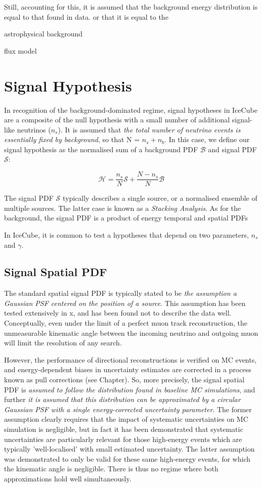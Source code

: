  Still, accounting for this, it is assumed that the background energy distribution is equal to that found in data. or that it is equal to the 
 
 astrophysical background
 
 flux model

\section{Signal Hypothesis}

In recognition of the background-dominated regime, signal hypotheses in IceCube are a composite of the null hypothesis with a small number of additional signal-like neutrinos ($n_{s}$). It is assumed that \emph{the total number of neutrino events is essentially fixed by background}, so that N = $n_{s} + n_{b}$. In this case, we define our signal hypothesis as the normalised sum of a background PDF $\mathcal{B}$ and signal PDF $\mathcal{S}$:

\[ \mathcal{H}= \frac{n_{s}}{N} \mathcal{S} + \frac{N - n_{s}}{N} \mathcal{B}  \]

The signal PDF $\mathcal{S}$ typically describes a single source, or a normalised ensemble of multiple sources. The latter case is known as a \emph{Stacking Analysis}. As for the background, the signal PDF is a product of energy temporal and spatial PDFs

In IceCube, it is common to test a hypotheses that depend on two parameters, $n_{s}$ and $\gamma$. 

\subsection{Signal Spatial PDF}

The standard spatial signal PDF is typically stated to be \emph{the assumption a Gaussian PSF centered on the position of a source}. This assumption has been tested extensively in x, and has been found not to describe the data well. Conceptually, even under the limit of a perfect muon track reconstruction, the unmeasurable kinematic angle between the incoming neutrino and outgoing muon will limit the resolution of any search.

However, the performance of directional reconstructions is verified on MC events, and energy-dependent biases in uncertainty estimates are corrected in a process known as pull corrections (see Chapter). So, more precisely, the signal spatial PDF is \emph{assumed to follow the distribution found in baseline MC simulations}, and further \emph{it is assumed that this distribution can be approximated by a circular Gaussian PSF with a single energy-corrected uncertainty parameter}. The former assumption clearly requires that the impact of systematic uncertainties on MC simulation is negligible, but in fact it has been demonstrated that systematic uncertainties are particularly relevant for those high-energy events which are typically 'well-localised' with small estimated uncertainty. The latter assumption was demonstrated to only be valid for these same high-energy events, for which the kinematic angle is negligible. There is thus no regime where both approximations hold well simultaneously.

